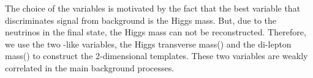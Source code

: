 The choice of the variables is motivated by the fact that the best 
variable that discriminates signal from background is the Higgs mass. 
But, due to the neutrinos in the final state, the Higgs mass can not be 
reconstructed. Therefore, we use the two \mHi-like variables, 
the Higgs transverse mass(\mT) and the di-lepton mass(\mll)
to construct the 2-dimensional templates. These two variables are 
weakly correlated in the main background processes.
\begin{figure}[htp]
\centering
{}
\subfigure[\qqww]{
}
\end{figure}
